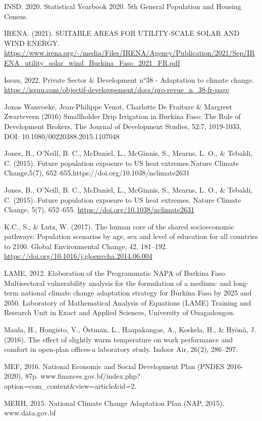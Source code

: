 \documentclass[
]{book}
\begin{document}
INSD; 2020. Statistical Yearbook 2020. 5th General Population and Housing Census.

IRENA. (2021). SUITABLE AREAS FOR UTILITY-SCALE SOLAR AND WIND ENERGY. \url{https://www.irena.org/-/media/Files/IRENA/Agency/Publication/2021/Sep/IRENA_utility_solar_wind_Burkina_Faso_2021_FR.pdf}

Issuu, 2022. Private Sector \& Development n°38 - Adaptation to climate change. \url{https://issuu.com/objectif-developpement/docs/pro-revue_n_38-fr-page}

Jonas Wanvoeke, Jean-Philippe Venot, Charlotte De Fraiture \& Margreet Zwarteveen (2016) Smallholder Drip Irrigation in Burkina Faso: The Role of Development Brokers, The Journal of Development Studies, 52:7, 1019-1033, DOI: 10.1080/00220388.2015.1107048

Jones, B., O'Neill, B. C., McDaniel, L., McGinnis, S., Mearns, L. O., \& Tebaldi, C. (2015). Future population exposure to US heat extremes.Nature Climate Change,5(7), 652--655.https://doi.org/10.1038/nclimate2631

Jones, B., O'Neill, B. C., McDaniel, L., McGinnis, S., Mearns, L. O., \& Tebaldi, C. (2015). Future population exposure to US heat extremes. Nature Climate Change, 5(7), 652--655. \url{https://doi.org/10.1038/nclimate2631}

K.C., S., \& Lutz, W. (2017). The human core of the shared socioeconomic pathways: Population scenarios by age, sex and level of education for all countries to 2100. Global Environmental Change, 42, 181--192. \url{https://doi.org/10.1016/j.gloenvcha.2014.06.004}

LAME, 2012. Elaboration of the Programmatic NAPA of Burkina Faso. Multisectoral vulnerability analysis for the formulation of a medium- and long-term national climate change adaptation strategy for Burkina Faso by 2025 and 2050. Laboratory of Mathematical Analysis of Equations (LAME) Training and Research Unit in Exact and Applied Sciences, University of Ouagadougou.

Maula, H., Hongisto, V., Östman, L., Haapakangas, A., Koskela, H., \& Hyönä, J. (2016). The effect of slightly warm temperature on work performance and comfort in open-plan offices-a laboratory study. Indoor Air, 26(2), 286--297.

MEF, 2016. National Economic and Social Development Plan (PNDES 2016-2020), 87p. www.finances.gov.bf/index.php?option=com\_content\&view=article\&id=2.

MERH, 2015. National Climate Change Adaptation Plan (NAP, 2015). www.data.gov.bf
\end{document}
